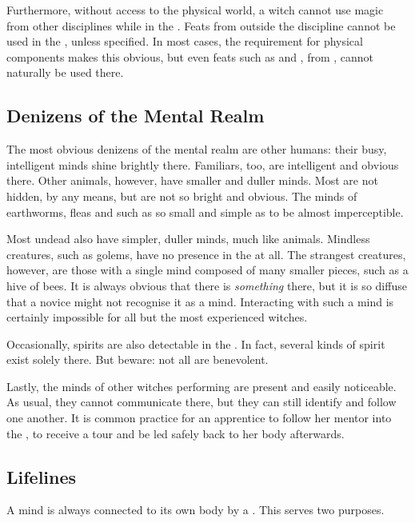 Furthermore, without access to the physical world, a witch cannot use magic from other disciplines while in the {\mentalrealm}.
Feats from outside the  discipline cannot be used in the {\mentalrealm}, unless specified.
In most cases, the requirement for physical components makes this obvious, but even feats such as  and , from , cannot naturally be used there.

\subsection{Denizens of the Mental Realm}

The most obvious denizens of the mental realm are other humans: their busy, intelligent minds shine brightly there.
Familiars, too, are intelligent and obvious there.
Other animals, however, have smaller and duller minds.
Most are not hidden, by any means, but are not so bright and obvious.
The minds of earthworms, fleas and such as so small and simple as to be almost imperceptible.

Most undead also have simpler, duller minds, much like animals.
Mindless creatures, such as golems, have no presence in the {\mentalrealm} at all.
The strangest creatures, however, are those with a single mind composed of many smaller pieces, such as a hive of bees.
It is always obvious that there is \emph{something} there, but it is so diffuse that a novice might not recognise it as a mind.
Interacting with such a mind is certainly impossible for all but the most experienced witches.

Occasionally, spirits are also detectable in the {\mentalrealm}.
In fact, several kinds of spirit exist solely there.
But beware: not all are benevolent.

Lastly, the minds of other witches performing  are present and easily noticeable.
As usual, they cannot communicate there, but they can still identify and follow one another.
It is common practice for an apprentice to follow her mentor into the {\mentalrealm}, to receive a tour and be led safely back to her body afterwards.

\subsection{Lifelines}

A mind is always connected to its own body by a {\lifeline}.
This {\lifeline} serves two purposes.

